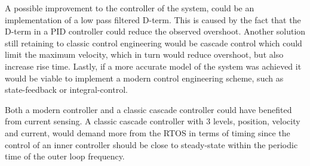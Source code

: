 \documentclass[../../Main]{subfiles}
\begin{document}

A possible improvement to the controller of the system, could be an implementation of a low pass filtered D-term. This is caused by the fact that the D-term in a PID controller could reduce the observed overshoot.
Another solution still retaining to classic control engineering would be cascade control which could limit the maximum velocity, which in turn would reduce overshoot, but also increase rise time.
Lastly, if a more accurate model of the system was achieved it would be viable to implement a modern control engineering scheme, such as state-feedback or integral-control.

Both a modern controller and a classic cascade controller could have benefited from current sensing.
A classic cascade controller with 3 levels, position, velocity and current, would demand more from the RTOS in terms of timing since the control of an inner controller should be close to steady-state within the periodic time of the outer loop frequency.
\end{document}
